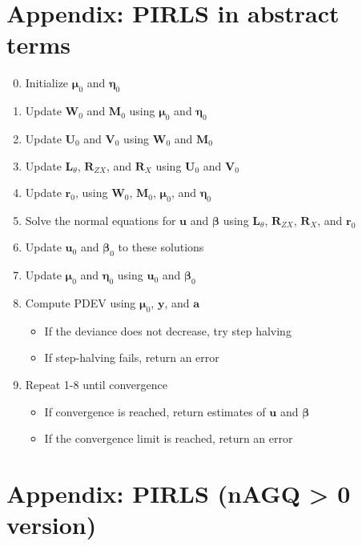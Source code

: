 \documentclass{jss}
\begin{document}
\section{Appendix: PIRLS in abstract terms}

\begin{enumerate}
\setcounter{enumi}{-1}
\item Initialize $\bm\mu_0$ and $\bm\eta_0$
\item Update $\bm W_0$ and $\bm M_0$ using $\bm\mu_0$ and $\bm\eta_0$
\item Update $\bm U_0$ and $\bm V_0$ using $\bm W_0$ and $\bm M_0$
\item Update $\bm L_\theta$, $\bm R_{ZX}$, and $\bm R_{X}$ using $\bm U_0$ and $\bm V_0$
\item Update $\bm r_0$, using $\bm W_0$, $\bm M_0$, $\bm\mu_0$, and $\bm\eta_0$
\item Solve the normal equations for $\bm u$ and $\bm\beta$ using
  $\bm L_\theta$, $\bm R_{ZX}$, $\bm R_{X}$, and $\bm r_0$
\item Update $\bm u_0$ and $\bm\beta_0$ to these solutions
\item Update $\bm\mu_0$ and $\bm\eta_0$ using $\bm u_0$ and
  $\bm\beta_0$
\item Compute PDEV
  using $\bm\mu_0$, $\bm y$, and $\bm a$
\begin{itemize}
\item If the deviance does not decrease, try step halving
\item If step-halving fails, return an error
\end{itemize}
\item Repeat 1-8 until convergence
\begin{itemize}
\item If convergence is reached, return estimates of $\bm u$ and $\bm\beta$
\item If the convergence limit is reached, return an error
\end{itemize}
\end{enumerate}

\section{Appendix: PIRLS (nAGQ > 0 version)}
\end{document}

